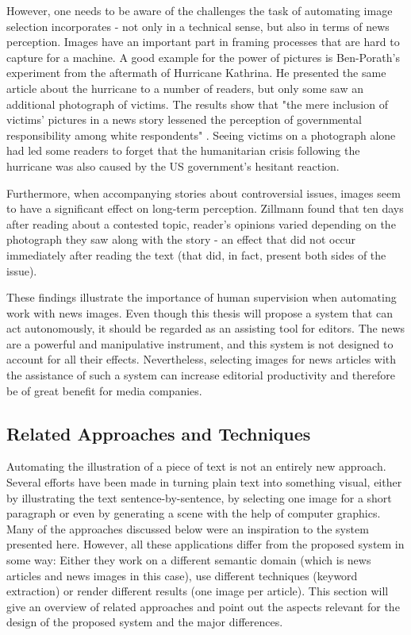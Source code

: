 \documentclass[11pt,a4paper,twoside]{article}
\begin{document}
However, one needs to be aware of the challenges the task of automating image selection incorporates - not only in a technical sense, but also in terms of news perception. Images have an important part in framing processes that are hard to capture for a machine. A good example for the power of pictures is Ben-Porath's experiment from the aftermath of Hurricane Kathrina. \cite{Ben-Porath2010NewsKatrina} He presented the same article about the hurricane to a number of readers, but only some saw an additional photograph of victims. The results show that "the mere inclusion of victims’ pictures in a news story lessened the perception of governmental responsibility among white respondents" \cite[p. 482]{Ben-Porath2010NewsKatrina}. Seeing victims on a photograph alone had led some readers to forget that the humanitarian crisis following the hurricane was also caused by the US government's hesitant reaction.

Furthermore, when accompanying stories about controversial issues, images seem to have a significant effect on long-term perception. Zillmann found that ten days after reading about a contested topic, reader's opinions varied depending on the photograph they saw along with the story - an effect that did not occur immediately after reading the text (that did, in fact, present both sides of the issue). \cite{Zillmann1999EffectsPerception}

These findings illustrate the importance of human supervision when automating work with news images. Even though this thesis will propose a system that can act autonomously, it should be regarded as an assisting tool for editors. The news are a powerful and manipulative instrument, and this system is not designed to account for all their effects. Nevertheless, selecting images for news articles with the assistance of such a system can increase editorial productivity and therefore be of great benefit for media companies.

\subsection{Related Approaches and Techniques} \label{TheoryTech}

Automating the illustration of a piece of text is not an entirely new approach. Several efforts have been made in turning plain text into something visual, either by illustrating the text sentence-by-sentence, by selecting one image for a short paragraph or even by generating a scene with the help of computer graphics. Many of the approaches discussed below were an inspiration to the system presented here. However, all these applications differ from the proposed system in some way: Either they work on a different semantic domain (which is news articles and news images in this case), use different techniques (keyword extraction) or render different results (one image per article). This section will give an overview of related approaches and point out the aspects relevant for the design of the proposed system and the major differences.
\end{document}
